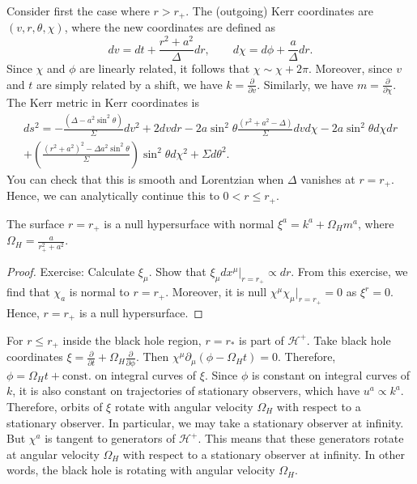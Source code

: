 Consider first the case where $r > r_+$.
The (outgoing) Kerr coordinates are $(v, r, \theta, \chi)$, where the new coordinates are defined as
\begin{equation}
  dv = dt + \frac{r^2 + a^2}{\Delta} dr, \qquad d\chi = d\phi + \frac{a}{\Delta} dr.
\end{equation}
Since $\chi$ and $\phi$ are linearly related, it follows that $\chi \sim \chi + 2 \pi$.
Moreover, since $v$ and $t$ are simply related by a shift, we have $k = \frac{\partial }{\partial v}$. Similarly, we have $m = \frac{\partial }{\partial \chi}$.
The Kerr metric in Kerr coordinates is
\begin{multline}
  ds^2 = -\frac{(\Delta - a^2 \sin^2 \theta)}{\Sigma} dv^2 + 2 d v dr - 2a \sin^2 \theta \frac{(r^2 + a ^2 - \Delta)}{\Sigma} d v d\chi - 2a \sin^2 \theta d\chi dr \\
  + \left( \frac{(r^2 + a^2)^2 - \Delta a^2 \sin^2 \theta}{\Sigma} \right) \sin^2 \theta d \chi^2 + \Sigma d\theta^2.
\end{multline}
You can check that this is smooth and Lorentzian when $\Delta$ vanishes at $r = r_+$. Hence, we can analytically continue this to $0 < r \leq r_+$.

\begin{claim}
  The surface $r = r_+$ is a null hypersurface with normal $\xi^{a} = k^{a} + \Omega_H m^{a}$, where $\Omega_H = \frac{a}{r^2_+ + a^2}$.
\end{claim}
\begin{proof}
  Exercise: Calculate $\xi_\mu$. Show that $\xi_\mu d x^{\mu} \rvert_{r = r_+} \propto dr$.
  From this exercise, we find that $\chi_a$ is normal to $r = r_+$.
  Moreover, it is null $\chi^{\mu} \chi_{\mu} \rvert_{r = r_+} = 0$ as $\xi^r = 0$.
  Hence, $r = r_+$ is a null hypersurface.
\end{proof}

For $r \leq r_+$ inside the black hole region, $r = r_*$ is part of $\mathcal{H}^+$.
Take black hole coordinates $\xi = \frac{\partial }{\partial t} + \Omega_H \frac{\partial }{\partial \phi}$. Then $\chi^{\mu} \partial_{\mu} (\phi - \Omega_H t) = 0$. 
Therefore, $\phi = \Omega_H t + \text{const.}$ on integral curves of $\xi$.
Since $\phi$ is constant on integral curves of $k$, it is also constant on trajectories of stationary observers, which have $u^{a} \propto k^{a}$.
Therefore, orbits of $\xi$ rotate with angular velocity $\Omega_H$ with respect to a stationary observer.
In particular, we may take a stationary observer at infinity.
But $\chi^{a}$ is tangent to generators of $\mathcal{H}^+$. This means that these generators rotate at angular velocity $\Omega_H$ with respect to a stationary observer at infinity.
In other words, the black hole is rotating with angular velocity $\Omega_H$.


